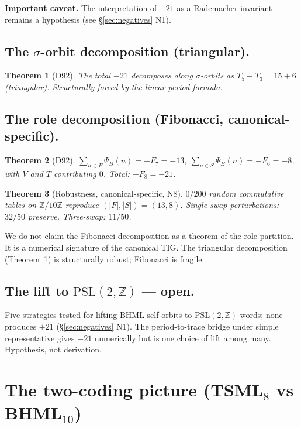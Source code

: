 \documentclass[11pt,reqno]{amsart}
\theoremstyle{plain}
\newtheorem{theorem}{Theorem}[section]
\theoremstyle{definition}
\theoremstyle{remark}
\newcommand{\Z}{\mathbb{Z}}
\newcommand{\BH}{\mathrm{BHML}}
\newcommand{\sig}{\sigma}
\begin{document}
\textbf{Important caveat.} The interpretation of $-21$ as a Rademacher
invariant remains a hypothesis (see \S\ref{sec:negatives} N1).

\subsection{The $\sig$-orbit decomposition (triangular).}
\begin{theorem}[D92]\label{thm:triangular}
The total $-21$ decomposes along $\sig$-orbits as
$T_{5} + T_{3} = 15 + 6$ (triangular). Structurally forced by the
linear period formula.
\end{theorem}

\subsection{The role decomposition (Fibonacci, canonical-specific).}
\begin{theorem}[D92]\label{thm:fibonacci}
$\sum_{n \in F} \Psi_{B}(n) = -F_{7} = -13$,
$\sum_{n \in S} \Psi_{B}(n) = -F_{6} = -8$, with $V$ and $T$
contributing $0$. Total: $-F_{8} = -21$.
\end{theorem}

\begin{theorem}[Robustness, canonical-specific, N8]
\label{thm:fib-robust}
$0/200$ random commutative tables on $\Z/10\Z$ reproduce
$(|F|, |S|) = (13, 8)$. Single-swap perturbations: $32/50$ preserve.
Three-swap: $11/50$.
\end{theorem}

We do not claim the Fibonacci decomposition as a theorem of the role
partition. It is a numerical signature of the canonical TIG. The
triangular decomposition (Theorem~\ref{thm:triangular}) is structurally
robust; Fibonacci is fragile.

\subsection{The lift to $\mathrm{PSL}(2, \Z)$ --- open.}
Five strategies tested for lifting $\BH$ self-orbits to
$\mathrm{PSL}(2, \Z)$ words; none produces $\pm 21$
(\S\ref{sec:negatives} N1). The period-to-trace bridge under simple
representative gives $-21$ numerically but is one choice of lift among
many. Hypothesis, not derivation.

\section{The two-coding picture (TSML$_{8}$ vs BHML$_{10}$)}
\end{document}
